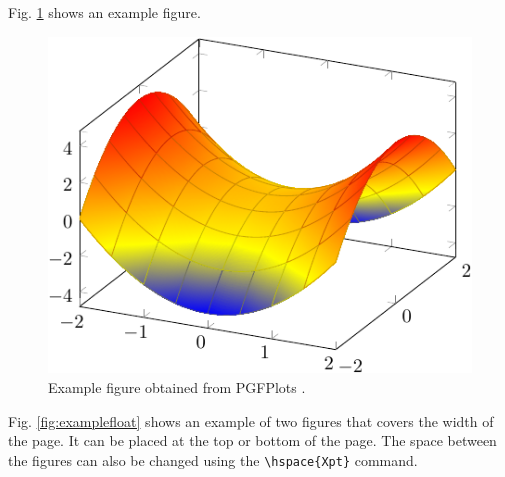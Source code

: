 \documentclass[9pt,a4paper,twoside]{tau-class/tau}
\begin{document}
	Fig. \ref{fig:figure} shows an example figure.
		
	\begin{figure}[H]
		\centering
		\includegraphics[width=0.75\columnwidth]{figures/Example.pdf}
		\caption{Example figure obtained from PGFPlots \cite{PFGPlots}.}
		\label{fig:figure}
	\end{figure}
		
        Fig. \ref{fig:examplefloat} shows an example of two figures that covers the width of the page. It can be placed at the top or bottom of the page. The space between the figures can also be changed using the \verb|\hspace{Xpt}| command.
		
\end{document}
